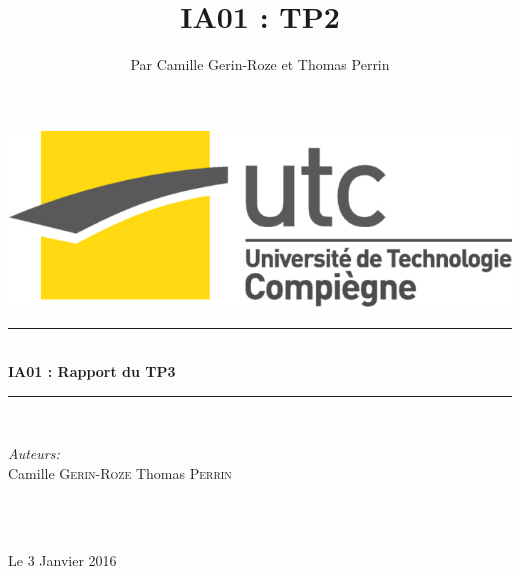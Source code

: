 \documentclass[a4paper,10pt]{report}
\title{IA01 : TP2}
\author{Par Camille Gerin-Roze et Thomas Perrin}
\begin{document}
\begin{titlepage}

\begin{flushright}
  \includegraphics[scale = 0.2]{logo_utc.jpg}
\end{flushright}
\vspace*{5cm}

\newcommand{\HRule}{\rule{\linewidth}{0.5mm}} %
\center %




\HRule \\[0.4cm]
{ \LARGE \bfseries  IA01 : Rapport du TP3}\\[0.4cm] %
\HRule \\[1.5cm]

\begin{minipage}{0.4\textwidth}
\begin{flushleft} \large
\emph{Auteurs:}\\
Camille \textsc{Gerin-Roze} \newline
Thomas \textsc{Perrin}
\end{flushleft}
\end{minipage}
~
\begin{minipage}{0.4\textwidth}

\end{minipage}\\[1.3cm]


{\large Le 3 Janvier 2016} %

\end{titlepage}
\tableofcontents
\end{document}
